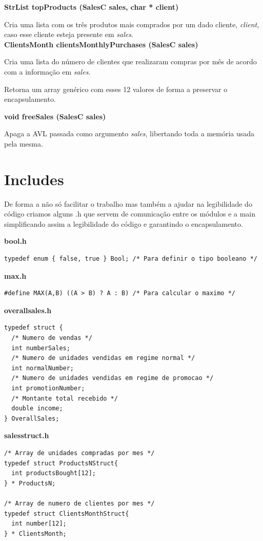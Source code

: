 \documentclass[10pt] {article}
\begin{document}
\noindent \textbf {StrList topProducts (SalesC sales, char * client)}
\par Cria uma lista com os três produtos mais comprados por um dado cliente, \emph{client}, caso esse cliente
esteja presente em \emph{sales}. \\

\noindent \textbf {ClientsMonth clientsMonthlyPurchases (SalesC sales)}
\par Cria uma lista do número de clientes que realizaram compras por mês de acordo com a informação em \emph{sales}.
\par Retorna um array genérico com esses 12 valores de forma a preservar o encapsulamento.

\noindent \textbf {void freeSales (SalesC sales)}
\par Apaga a AVL passada como argumento \emph{sales}, libertando toda a memória usada pela mesma. \\

\newpage
\section{Includes}
\par De forma a não só facilitar o trabalho mas também a ajudar na legibilidade do código criamos alguns .h
que servem de comunicação entre os módulos e a main simplificando assim a legibilidade do código e garantindo o encapsulamento.

\textbf{bool.h}
\begin{lstlisting}
typedef enum { false, true } Bool; /* Para definir o tipo booleano */
\end{lstlisting}

\textbf{max.h}
\begin{lstlisting}
#define MAX(A,B) ((A > B) ? A : B) /* Para calcular o maximo */
\end{lstlisting}

\textbf{overallsales.h}
\begin{lstlisting}
typedef struct {
  /* Numero de vendas */
  int numberSales;
  /* Numero de unidades vendidas em regime normal */
  int normalNumber;
  /* Numero de unidades vendidas em regime de promocao */
  int promotionNumber;
  /* Montante total recebido */
  double income;
} OverallSales;
\end{lstlisting}

\textbf{salesstruct.h}
\begin{lstlisting}
/* Array de unidades compradas por mes */
typedef struct ProductsNStruct{
  int productsBought[12];
} * ProductsN;

/* Array de numero de clientes por mes */
typedef struct ClientsMonthStruct{
  int number[12];
} * ClientsMonth;
\end{lstlisting}
\end{document}
